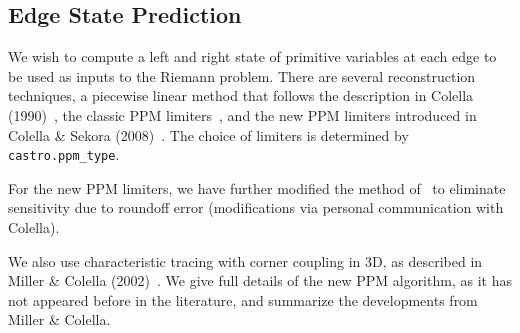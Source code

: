 \subsection{Edge State Prediction}
We wish to compute a left and right state of primitive variables at
each edge to be used as inputs to the Riemann problem.  There
are several reconstruction techniques, a piecewise
linear method that follows the description in Colella (1990)~\cite{colella:1990},
the classic PPM limiters~\cite{ppm}, and the new PPM limiters introduced
in Colella \& Sekora (2008)~\cite{colellasekora}.  The choice of
limiters is determined by {\tt castro.ppm\_type}.

For the new PPM limiters, we have further modified the method
of~\cite{colellasekora} to eliminate sensitivity due to roundoff error
(modifications via personal communication with Colella).

We also use characteristic tracing with corner coupling in 3D, as
described in Miller \& Colella (2002)~\cite{millercolella:2002}.  We
give full details of the new PPM algorithm, as it has not appeared before
in the literature, and summarize the developments from Miller \&
Colella.

